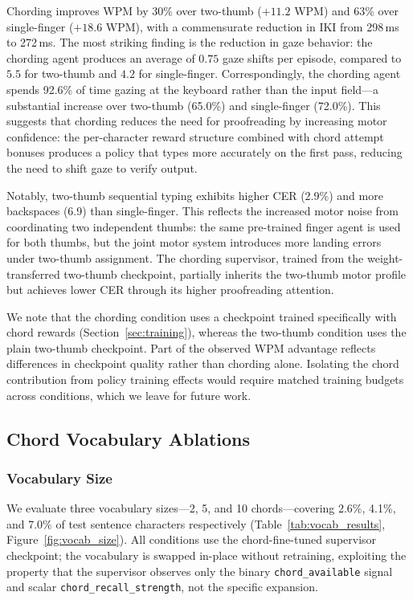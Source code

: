 \documentclass[sigconf,review,anonymous]{acmart}
\begin{document}
Chording improves WPM by 30\% over two-thumb ($+11.2$ WPM) and 63\% over single-finger ($+18.6$ WPM), with a commensurate reduction in IKI from 298\,ms to 272\,ms. The most striking finding is the reduction in gaze behavior: the chording agent produces an average of $0.75$ gaze shifts per episode, compared to $5.5$ for two-thumb and $4.2$ for single-finger. Correspondingly, the chording agent spends 92.6\% of time gazing at the keyboard rather than the input field—a substantial increase over two-thumb (65.0\%) and single-finger (72.0\%). This suggests that chording reduces the need for proofreading by increasing motor confidence: the per-character reward structure combined with chord attempt bonuses produces a policy that types more accurately on the first pass, reducing the need to shift gaze to verify output.

Notably, two-thumb sequential typing exhibits higher CER (2.9\%) and more backspaces (6.9) than single-finger. This reflects the increased motor noise from coordinating two independent thumbs: the same pre-trained finger agent is used for both thumbs, but the joint motor system introduces more landing errors under two-thumb assignment. The chording supervisor, trained from the weight-transferred two-thumb checkpoint, partially inherits the two-thumb motor profile but achieves lower CER through its higher proofreading attention.

We note that the chording condition uses a checkpoint trained specifically with chord rewards (Section~\ref{sec:training}), whereas the two-thumb condition uses the plain two-thumb checkpoint. Part of the observed WPM advantage reflects differences in checkpoint quality rather than chording alone. Isolating the chord contribution from policy training effects would require matched training budgets across conditions, which we leave for future work.

\subsection{Chord Vocabulary Ablations}
\label{sec:results_vocab}

\subsubsection{Vocabulary Size}
\label{sec:results_vocab_size}

We evaluate three vocabulary sizes—2, 5, and 10 chords—covering 2.6\%, 4.1\%, and 7.0\% of test sentence characters respectively (Table~\ref{tab:vocab_results}, Figure~\ref{fig:vocab_size}). All conditions use the chord-fine-tuned supervisor checkpoint; the vocabulary is swapped in-place without retraining, exploiting the property that the supervisor observes only the binary \texttt{chord\_available} signal and scalar \texttt{chord\_recall\_strength}, not the specific expansion.
\end{document}
